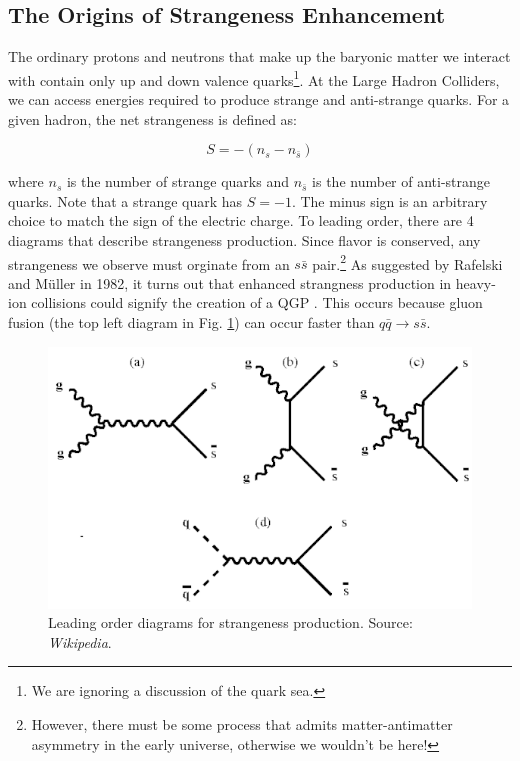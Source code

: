 \documentclass[../main.tex]{subfiles}
\begin{document}
\subsection{The Origins of Strangeness Enhancement}
The ordinary protons and neutrons that make up the baryonic matter we interact with contain only up and down valence quarks\footnote{We are ignoring a discussion of the quark sea.}. At the Large Hadron Colliders, we can access energies required to produce strange and anti-strange quarks. For a given hadron, the net strangeness is defined as:

\begin{equation}
    S = -(n_s - n_{\bar{s}})
\end{equation}

where $n_s$ is the number of strange quarks and $n_{\bar{s}}$ is the number of anti-strange quarks. Note that a strange quark has $S=-1$. The minus sign is an arbitrary choice to match the sign of the electric charge. To leading order, there are 4 diagrams that describe strangeness production. Since flavor is conserved, any strangeness we observe must orginate from an $s\bar{s}$ pair.\footnote{However, there must be some process that admits matter-antimatter asymmetry in the early universe, otherwise we wouldn't be here!} As suggested by Rafelski and M{\"u}ller in 1982, it turns out that enhanced strangness production in heavy-ion collisions could signify the creation of a QGP \cite{Rafelski:1982pu}. This occurs because gluon fusion (the top left diagram in Fig. \ref{fig:strange_diagram}) can occur faster than $q\bar{q}\rightarrow s\bar{s}$. 

\begin{figure}[h]
    \centering
    \includegraphics[scale=0.4]{introduction/figs/strangediagram.png}
    \caption{Leading order diagrams for strangeness production. Source: \textit{Wikipedia}.}
    \label{fig:strange_diagram}
\end{figure}
\end{document}
